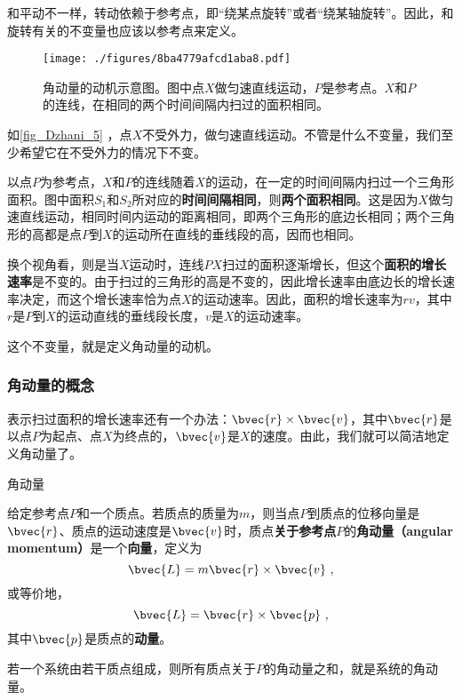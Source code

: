 和平动不一样，转动依赖于参考点，即“绕某点旋转”或者“绕某轴旋转”。因此，和旋转有关的不变量也应该以参考点来定义。


\begin{figure}[ht]
\centering
\texttt{[image: ./figures/8ba4779afcd1aba8.pdf]}
\caption{角动量的动机示意图。图中点$X$做匀速直线运动，$P$是参考点。$X$和$P$的连线，在相同的两个时间间隔内扫过的面积相同。} \label{fig_Dzhani_5}
\end{figure}


如\autoref{fig_Dzhani_5} ，点$X$不受外力，做匀速直线运动。不管是什么不变量，我们至少希望它在不受外力的情况下不变。

以点$P$为参考点，$X$和$P$的连线随着$X$的运动，在一定的时间间隔内扫过一个三角形面积。图中面积$S_1$和$S_2$所对应的\textbf{时间间隔相同}，则\textbf{两个面积相同}。这是因为$X$做匀速直线运动，相同时间内运动的距离相同，即两个三角形的底边长相同；两个三角形的高都是点$P$到$X$的运动所在直线的垂线段的高，因而也相同。



换个视角看，则是当$X$运动时，连线$PX$扫过的面积逐渐增长，但这个\textbf{面积的增长速率}是不变的。由于扫过的三角形的高是不变的，因此增长速率由底边长的增长速率决定，而这个增长速率恰为点$X$的运动速率。因此，面积的增长速率为$rv$，其中$r$是$P$到$X$的运动直线的垂线段长度，$v$是$X$的运动速率。


这个不变量，就是定义角动量的动机。



\subsubsection{角动量的概念}





表示扫过面积的增长速率还有一个办法：$\bvec{r}\times \bvec{v}$，其中$\bvec{r}$是以点$P$为起点、点$X$为终点的，$\bvec{v}$是$X$的速度。由此，我们就可以简洁地定义角动量了。


\begin{definition}{角动量}

给定参考点$P$和一个质点。若质点的质量为$m$，则当点$P$到质点的位移向量是$\bvec{r}$、质点的运动速度是$\bvec{v}$时，质点\textbf{关于参考点}$P$的\textbf{角动量（angular momentum）}是一个\textbf{向量}，定义为
\begin{equation}
\bvec{L} = m\bvec{r}\times \bvec{v}~, 
\end{equation}
或等价地，
\begin{equation}
\bvec{L} = \bvec{r}\times\bvec{p}~, 
\end{equation}
其中$\bvec{p}$是质点的\textbf{动量}。

若一个系统由若干质点组成，则所有质点关于$P$的角动量之和，就是系统的角动量。

\end{definition}



